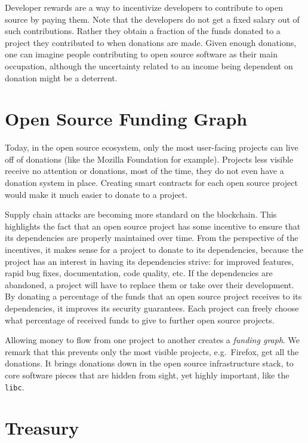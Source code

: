 Developer rewards are a way to incentivize developers to contribute to open source by paying them.
Note that the developers do not get a fixed salary out of such contributions.
Rather they obtain a fraction of the funds donated to a project they contributed to when donations are made.
Given enough donations, one can imagine people contributing to open source software as their main occupation, although the uncertainty related to an income being dependent on donation might be a deterrent.

\section{Open Source Funding Graph}

Today, in the open source ecosystem, only the most user-facing projects can live off of donations (like the Mozilla Foundation for example).
Projects less visible receive no attention or donations, most of the time, they do not even have a donation system in place.
Creating smart contracts for each open source project would make it much easier to donate to a project.

Supply chain attacks are becoming more standard on the blockchain.
This highlights the fact that an open source project has some incentive to ensure that its dependencies are properly maintained over time.
From the perspective of the incentives, it makes sense for a project to donate to its dependencies, because the project has an interest in having its dependencies strive: for improved features, rapid bug fixes, documentation, code quality, etc.
If the dependencies are abandoned, a project will have to replace them or take over their development.
By donating a percentage of the funds that an open source project receives to its dependencies, it improves its security guarantees.
Each project can freely choose what percentage of received funds to give to further open source projects.

Allowing money to flow from one project to another creates a \textit{funding graph}.
We remark that this prevents only the most visible projects, e.g.\ Firefox, get all the donations.
It brings donations down in the open source infrastructure stack, to core software pieces that are hidden from sight, yet highly important, like the \texttt{libc}.

\section{Treasury}

